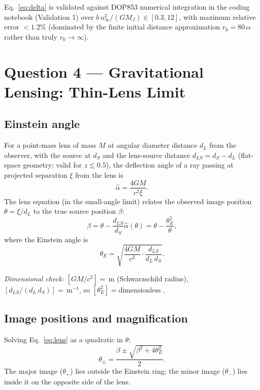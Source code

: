 \documentclass[11pt, a4paper]{article}
\newcommand{\thetaE}{\theta_{\!E}}
\newcommand{\unit}[1]{\,\mathrm{#1}}
\begin{document}
Eq.~\eqref{eq:delta} is validated against DOP853 numerical integration in the coding
notebook (Validation 1) over $b\,u_\infty^2/(GM_J) \in [0.3, 12]$,
with maximum relative error $< 1.2\%$ (dominated by the finite initial distance
approximation $r_0 = 80\,\alpha$ rather than truly $r_0 \to \infty$).

\section{Question 4 — Gravitational Lensing: Thin-Lens Limit}

\subsection*{Einstein angle}

For a point-mass lens of mass $M$ at angular diameter distance $d_L$ from the observer,
with the source at $d_S$ and the lens-source distance $d_{LS} = d_S - d_L$
(flat-space geometry; valid for $z \lesssim 0.5$), the deflection angle of a ray
passing at projected separation $\xi$ from the lens is
\[
  \hat\alpha = \frac{4GM}{c^2\xi}.
\]
The lens equation (in the small-angle limit) relates the observed image position
$\theta = \xi/d_L$ to the true source position $\beta$:
\begin{equation}
  \beta = \theta - \frac{d_{LS}}{d_S}\hat\alpha(\theta)
        = \theta - \frac{\thetaE^2}{\theta},
  \label{eq:lens}
\end{equation}
where the Einstein angle is
\begin{equation}
  \boxed{\thetaE = \sqrt{\frac{4GM}{c^2}\cdot\frac{d_{LS}}{d_L\,d_S}}.}
  \label{eq:thetaE}
\end{equation}

\textit{Dimensional check:}
$[GM/c^2] = \unit{m}$ (Schwarzschild radius), $[d_{LS}/(d_L\,d_S)] = \unit{m^{-1}}$,
so $[\thetaE^2] = \text{dimensionless}$ \checkmark.

\subsection*{Image positions and magnification}

Solving Eq.~\eqref{eq:lens} as a quadratic in $\theta$:
\begin{equation}
  \theta_\pm = \frac{\beta \pm \sqrt{\beta^2 + 4\thetaE^2}}{2}.
  \label{eq:images}
\end{equation}
The major image ($\theta_+$) lies outside the Einstein ring; the minor image ($\theta_-$)
lies inside it on the opposite side of the lens.
\end{document}

